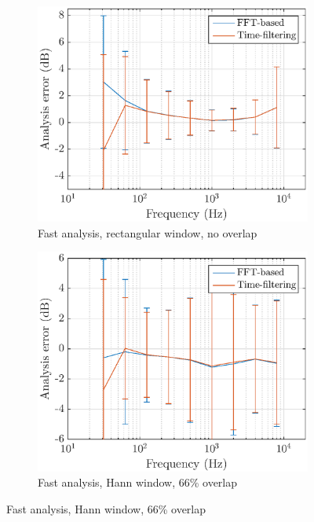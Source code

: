 \documentclass[sensors,article,accept,moreauthors,pdftex,10pt,a4paper]{mdpi}
\begin{document}
\begin{figure}[H]
    \centering
    \begin{subfigure}[H]{0.47\textwidth}
        \centering
       \includegraphics[width=1\textwidth]{figures/err_m_u_f_r.eps}
        \caption{Fast analysis, rectangular window, no overlap}
    \end{subfigure}
    \begin{subfigure}[H]{0.47\textwidth}
        \centering
        \includegraphics[width=1\textwidth]{figures/err_m_u_f_h.eps}
        \caption{Fast analysis, Hann window, 66\% overlap}
    \end{subfigure}

\end{figure}
\end{document}
